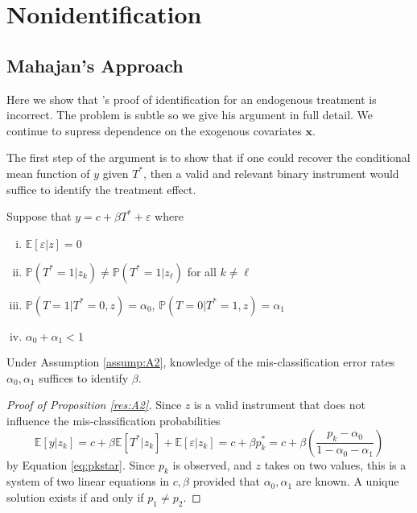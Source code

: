 \section{Nonidentification}

\subsection{Mahajan's Approach}
Here we show that \citeauthor{Mahajan}'s proof of identification for an endogenous treatment is incorrect.
The problem is subtle so we give his argument in full detail.
We continue to supress dependence on the exogenous covariates $\mathbf{x}$.

The first step of the argument is to show that if one could recover the conditional mean function of $y$ given $T^*$, then a valid and relevant binary instrument would suffice to identify the treatment effect.  
\begin{assump}[Mahajan A2]\mbox{}
  \label{assump:A2} Suppose that $y = c+ \beta T^* + \varepsilon$ where
  \begin{enumerate}[(i)]
    \item $\mathbb{E}[\varepsilon|z]=0$
    \item $\mathbb{P}(T^*=1|z_k)\neq \mathbb{P}(T^*=1|z_\ell)$ for all $k\neq \ell$
    \item $\mathbb{P}(T = 1| T^* = 0, z) = \alpha_0$, $\mathbb{P}(T = 0| T^* = 1, z) = \alpha_1$
    \item $\alpha_0 + \alpha_1 < 1$
  \end{enumerate}
\end{assump}

\begin{res}[Mahajan A2]
  \label{res:A2}
Under Assumption \ref{assump:A2}, knowledge of the mis-classification error rates $\alpha_0, \alpha_1$ suffices to identify $\beta$.
\end{res}
\begin{proof}[Proof of Proposition \ref{res:A2}]
Since $z$ is a valid instrument that does not influence the mis-classification probabilities
\[\mathbb{E}[y|z_k] = c + \beta \mathbb{E}[T^*|z_k] + \mathbb{E}[\varepsilon|z_k] = c + \beta p_k^* = c + \beta \left( \frac{p_k - \alpha_0}{1 - \alpha_0 - \alpha_1} \right)\]
by Equation \ref{eq:pkstar}.
Since $p_k$ is observed, and $z$ takes on two values, this is a system of two linear equations in $c,\beta$ provided that $\alpha_0,\alpha_1$ are known.
A unique solution exists if and only if $p_1 \neq p_2$.
\end{proof}


